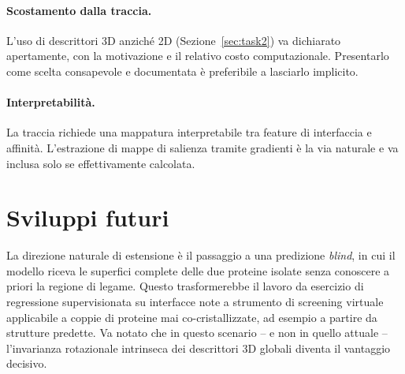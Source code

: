 \documentclass[11pt,a4paper]{article}
\begin{document}
\paragraph{Scostamento dalla traccia.} L'uso di descrittori 3D anziché 2D (Sezione~\ref{sec:task2}) va dichiarato apertamente, con la motivazione e il relativo costo computazionale. Presentarlo come scelta consapevole e documentata è preferibile a lasciarlo implicito.

\paragraph{Interpretabilità.} La traccia richiede una mappatura interpretabile tra feature di interfaccia e affinità. L'estrazione di mappe di salienza tramite gradienti è la via naturale e va inclusa solo se effettivamente calcolata.

\section{Sviluppi futuri}
La direzione naturale di estensione è il passaggio a una predizione \emph{blind}, in cui il modello riceva le superfici complete delle due proteine isolate senza conoscere a priori la regione di legame. Questo trasformerebbe il lavoro da esercizio di regressione supervisionata su interfacce note a strumento di screening virtuale applicabile a coppie di proteine mai co-cristallizzate, ad esempio a partire da strutture predette. Va notato che in questo scenario -- e non in quello attuale -- l'invarianza rotazionale intrinseca dei descrittori 3D globali diventa il vantaggio decisivo.
\end{document}
